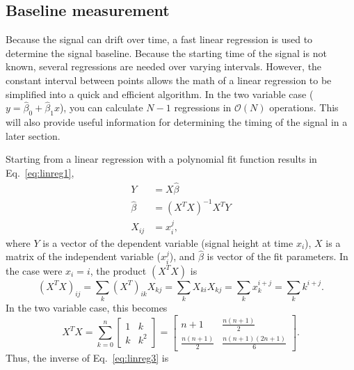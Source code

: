 \documentclass[oneside,12pt]{memoir}
\begin{document}
\subsection{Baseline measurement}
\label{sec:baseline}
Because the signal can drift over time, a fast linear regression is used to determine the signal baseline. Because the starting time of the signal is not known, several regressions are needed over varying intervals. However, the constant interval between points allows the math of a linear regression to be simplified into a quick and efficient algorithm. In the two variable case ($y=\hat{\beta}_0+\hat{\beta}_1 x$), you can calculate $N-1$ regressions in $\mathcal{O}(N)$ operations. This will also provide useful information for determining the timing of the signal in a later section.\par
Starting from a linear regression with a polynomial fit function results in Eq.~\ref{eq:linreg1},
\begin{subequations}
	\label{eq:linreg1}
	\begin{align}
		\label{eq:linreg1a}
		Y &= X \hat{\beta}\\
		\label{eq:linreg1b}
		\hat\beta &= \left(X^T X\right)^{-1}X^T Y\\
		\label{eq:linreg1c}
		X_{ij} &= x_i^j,
	\end{align}
\end{subequations}
where $Y$ is a vector of the dependent variable (signal height at time $x_i$), $X$ is a matrix of the independent variable ($x_i^j$), and $\hat{\beta}$ is vector of the fit parameters. In the case were $x_i=i$, the product $(X^T X)$ is
\begin{equation}
	\label{eq:linreg2}
	\left(X^T X\right)_{ij}=\sum_k {\left(X^T\right)_{ik}X_{kj}}=
		\sum_k {X_{ki}X_{kj}}=\sum_k {x_k^{i+j}}=\sum_k {k^{i+j}}.
\end{equation}
In the two variable case, this becomes
\begin{equation}
	\label{eq:linreg3}
	X^T X=\sum_{k=0}^n {
		\begin{bmatrix}
			1 & k \\
			k & k^2
		\end{bmatrix}
	}=\begin{bmatrix}
		n+1 & \frac{n\left(n+1\right)}{2} \\
		\frac{n\left(n+1\right)}{2} & \frac{n\left(n+1\right)\left(2n+1\right)}{6}
	\end{bmatrix}.
\end{equation}
Thus, the inverse of Eq.~\ref{eq:linreg3} is
\end{document}
